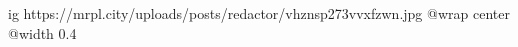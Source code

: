  
 
 
 
 

\ifcmt
  ig https://mrpl.city/uploads/posts/redactor/vhznsp273vvxfzwn.jpg
  @wrap center
  @width 0.4
\fi
